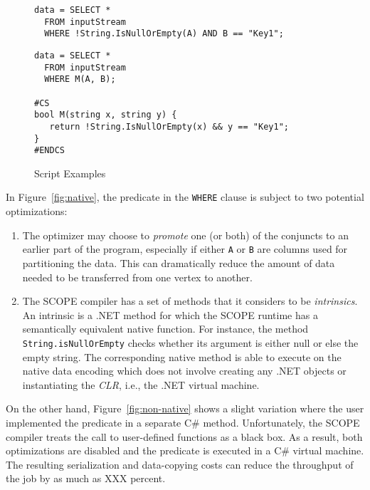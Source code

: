 \begin{figure}[ht]
 \begin{minipage}[b]{\linewidth}
  
   \begin{verbatim}
data = SELECT *
  FROM inputStream
  WHERE !String.IsNullOrEmpty(A) AND B == "Key1";
\end{verbatim}

    \label{fig:native}
  \end{minipage}
  \begin{minipage}[b]{\linewidth}
   \begin{verbatim}
data = SELECT *
  FROM inputStream
  WHERE M(A, B);

#CS
bool M(string x, string y) {
   return !String.IsNullOrEmpty(x) && y == "Key1";
}
#ENDCS
    \end{verbatim}

    \label{fig:non-native}
  \end{minipage}


\caption{Script Examples}
\label{fig:example}
\end{figure}

In Figure~\ref{fig:native}, the predicate in the {\tt WHERE} clause is subject to two potential optimizations:
\begin{enumerate}
\item The optimizer may choose to {\em promote} one (or both) of the conjuncts to an earlier part of the program, especially if either {\tt A} or {\tt B} are columns used for partitioning the data.
This can dramatically reduce the amount of data needed to be transferred from one vertex to another.
\item The SCOPE compiler has a set of methods that it considers to be {\em intrinsics}.
An intrinsic is a .NET method for which the SCOPE runtime has a semantically equivalent native function.
For instance, the method {\tt String.isNullOrEmpty} checks whether its argument is either null or else the empty string.
The corresponding native method is able to execute on the native data encoding which does not involve creating any .NET objects or instantiating the {\em CLR}, i.e., the .NET virtual machine.
\end{enumerate}

On the other hand, Figure~\ref{fig:non-native} shows a slight variation where the user implemented the predicate in a separate C\# method. Unfortunately, the SCOPE compiler treats the call to user-defined functions as a black box. As a result, both optimizations are disabled and the predicate is executed in a C\# virtual machine. The resulting serialization and data-copying costs can reduce the throughput of the job by as much as XXX percent. 


